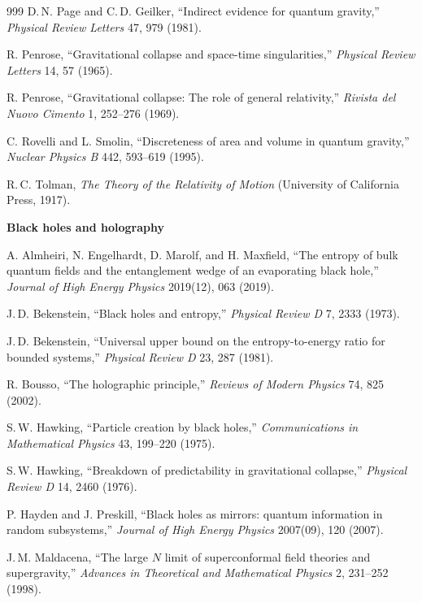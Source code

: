 \begin{thebibliography}{999}
 D.\,N. Page and C.\,D. Geilker, ``Indirect evidence for quantum gravity,'' \textit{Physical Review Letters} 47, 979 (1981).

 R. Penrose, ``Gravitational collapse and space-time singularities,'' \textit{Physical Review Letters} 14, 57 (1965).

 R. Penrose, ``Gravitational collapse: The role of general relativity,'' \textit{Rivista del Nuovo Cimento} 1, 252--276 (1969).

 C. Rovelli and L. Smolin, ``Discreteness of area and volume in quantum gravity,'' \textit{Nuclear Physics B} 442, 593--619 (1995).

 R.\,C. Tolman, \textit{The Theory of the Relativity of Motion} (University of California Press, 1917).

\item[] \textbf{Black holes and holography}

 A. Almheiri, N. Engelhardt, D. Marolf, and H. Maxfield, ``The entropy of bulk quantum fields and the entanglement wedge of an evaporating black hole,'' \textit{Journal of High Energy Physics} 2019(12), 063 (2019).

 J.\,D. Bekenstein, ``Black holes and entropy,'' \textit{Physical Review D} 7, 2333 (1973).

 J.\,D. Bekenstein, ``Universal upper bound on the entropy-to-energy ratio for bounded systems,'' \textit{Physical Review D} 23, 287 (1981).

 R. Bousso, ``The holographic principle,'' \textit{Reviews of Modern Physics} 74, 825 (2002).

 S.\,W. Hawking, ``Particle creation by black holes,'' \textit{Communications in Mathematical Physics} 43, 199--220 (1975).

 S.\,W. Hawking, ``Breakdown of predictability in gravitational collapse,'' \textit{Physical Review D} 14, 2460 (1976).

 P. Hayden and J. Preskill, ``Black holes as mirrors: quantum information in random subsystems,'' \textit{Journal of High Energy Physics} 2007(09), 120 (2007).

 J.\,M. Maldacena, ``The large \(N\) limit of superconformal field theories and supergravity,'' \textit{Advances in Theoretical and Mathematical Physics} 2, 231--252 (1998).


\end{thebibliography}
